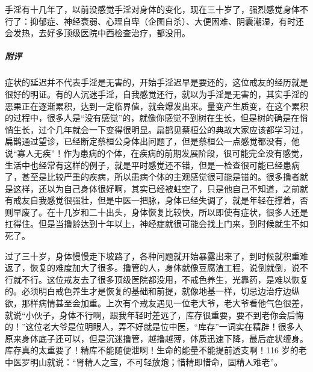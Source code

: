 \begin{case}
    手淫有十几年了，以前没感觉手淫对身体的变化，现在三十岁了，强烈感觉身体不行了：抑郁症、神经衰弱、心理自卑（企图自杀）、大便困难、阴囊潮湿，有时还会发热，去好多顶级医院中西检查治疗，都没用。
    \subparagraph{附评} 症状的延迟并不代表手淫是无害的，开始手淫迟早是要还的，这位戒友的经历就是很好的明证。有的人沉迷手淫，自我感觉还行，就以为手淫是无害的，其实手淫的恶果正在逐渐累积，达到一定临界值，就会爆发出来。量变产生质变，在这个累积的过程中，很多人是“没有感觉”的，就像你感觉不到树在生长，但是树的确是在悄悄生长，过个几年就会一下变得很明显。扁鹊见蔡桓公的典故大家应该都学习过，扁鹊通过望诊，已经断定蔡桓公身体出问题了，但是蔡桓公一点感觉都没有，他说“寡人无疾”！作为患病的个体，在疾病的前期发展阶段，很可能完全没有感觉，生活中也经常有这样的例子，就是平时感觉还不错，但是一检查很可能已经患病了，甚至是比较严重的疾病，所以患病个体的主观感觉很可能是错的。很多撸者就是这样，还以为自己身体很好啊，其实已经被蛀空了，只是他自己不知道，之前就有戒友自我感觉很强壮，但是中医一把脉，身体已经失调了，就是年轻在撑着，否则早废了。在十几岁和二十出头，身体恢复比较快，所以即使有症状，很多人还是扛得住。但是当撸龄达到十年以上，神经症就很可能会找上门来，到时候就生不如死了。

    过了三十岁，身体慢慢走下坡路了，各种问题就开始暴露出来了，到时候就积重难返了，恢复的难度加大了很多。撸管的人，身体就像豆腐渣工程，说倒就倒，说不行就不行。这位戒友去了很多顶级医院都没用，不戒色养生，光靠药，是难以恢复的。必须明白戒色养生才是恢复的基础和前提，就像地基一样，切忌边治疗边纵欲，那样病情甚至会加重。上次有个戒友遇见一位老大爷，老大爷看他气色很差，就说“小伙子，身体不行啊，跟我年轻时差远了，库存很重要，要不到老你会后悔的！”这位老大爷是位明眼人，弄不好就是位中医，“库存”一词实在精辟！很多人原来身体底子还可以，但是沉迷撸管，越撸越薄，体质迅速下降，最后症状缠身。库存真的太重要了！精库不能随便泄啊！生命的能量不能提前透支啊！116 岁的老中医罗明山就说：“肾精人之宝，不可轻放炮；惜精即惜命，固精人难老”。
\end{case}

